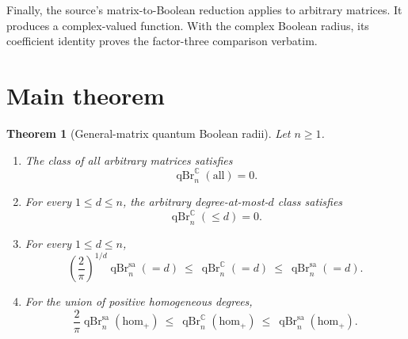 \documentclass[11pt]{article}
\newtheorem{theorem}{Theorem}
\theoremstyle{remark}
\newcommand{\C}{\mathbb C}
\newcommand{\qBr}{\operatorname{qBr}}
\newcommand{\sa}{\mathrm{sa}}
\newcommand{\all}{\mathrm{all}}
\newcommand{\homc}{\mathrm{hom}}
\begin{document}
Finally, the source's matrix-to-Boolean reduction applies to arbitrary
matrices.  It produces a complex-valued function.  With the complex Boolean
radius, its coefficient identity proves the factor-three comparison verbatim.

\section{Main theorem}

\begin{theorem}[General-matrix quantum Boolean radii]\label{thm:main}
Let $n\geq1$.
\begin{enumerate}[label=\textup{(\roman*)}]
\item The class of all arbitrary matrices satisfies
\[
 \boxed{\qBr_n^{\C}(\all)=0.}
\]
\item For every $1\leq d\leq n$, the arbitrary degree-at-most-$d$ class
satisfies
\[
 \boxed{\qBr_n^{\C}(\leq d)=0.}
\]
\item For every $1\leq d\leq n$,
\begin{equation}\label{eq:fixeddegree}
 \boxed{
 \left(\frac{2}{\pi}\right)^{1/d}\qBr_n^{\sa}(=d)
 \ \leq\ \qBr_n^{\C}(=d)
 \ \leq\ \qBr_n^{\sa}(=d).}
\end{equation}
\item For the union of positive homogeneous degrees,
\begin{equation}\label{eq:homogeneous}
 \boxed{
 \frac{2}{\pi}\qBr_n^{\sa}(\homc_+)
 \ \leq\ \qBr_n^{\C}(\homc_+)
 \ \leq\ \qBr_n^{\sa}(\homc_+).}
\end{equation}
\end{enumerate}
\end{theorem}
\end{document}
